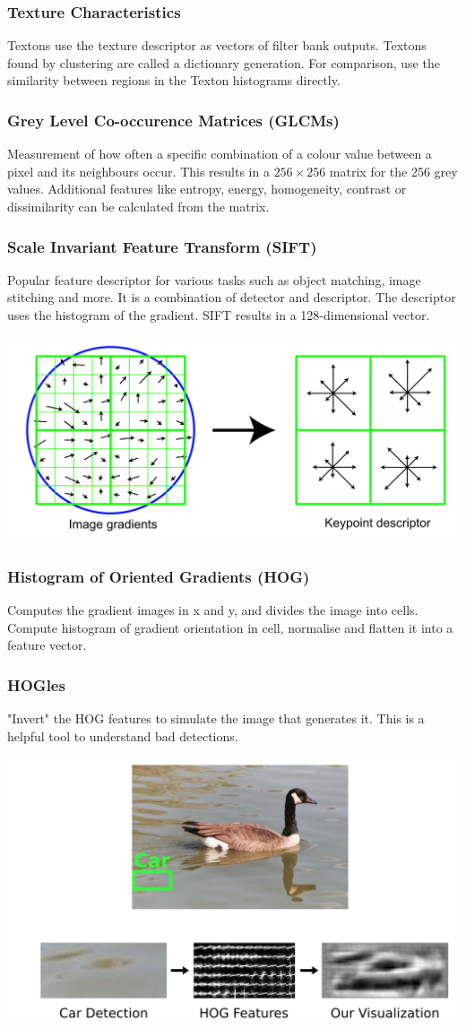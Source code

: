 \documentclass[11pt]{article}
\theoremstyle{definition}
\begin{document}
\subsubsection{Texture Characteristics}
Textons use the texture descriptor as vectors of filter bank outputs. Textons found by clustering are called a dictionary generation. For comparison, use the similarity between regions in the Texton histograms directly.

\subsubsection{Grey Level Co-occurence Matrices (GLCMs)}
Measurement of how often a specific combination of a colour value between a pixel and its neighbours occur. This results in a $256\times 256$ matrix for the 256 grey values. Additional features like entropy, energy, homogeneity, contrast or dissimilarity can be calculated from the matrix.

\subsubsection{Scale Invariant Feature Transform (SIFT)}
Popular feature descriptor for various tasks such as object matching, image stitching and more. It is a combination of detector and descriptor. The descriptor uses the histogram of the gradient. SIFT results in a 128-dimensional vector.
\begin{center}
	\includegraphics[width=0.6\linewidth]{img/SIFT}
\end{center}

\subsubsection{Histogram of Oriented Gradients (HOG)}
Computes the gradient images in x and y, and divides the image into cells. Compute histogram of gradient orientation in cell, normalise and flatten it into a feature vector.

\subsubsection{HOGles}
"Invert" the HOG features to simulate the image that generates it. This is a helpful tool to understand bad detections.

\begin{center}
	\includegraphics[width=0.6\linewidth]{img/HOGles}
\end{center}
\end{document}
